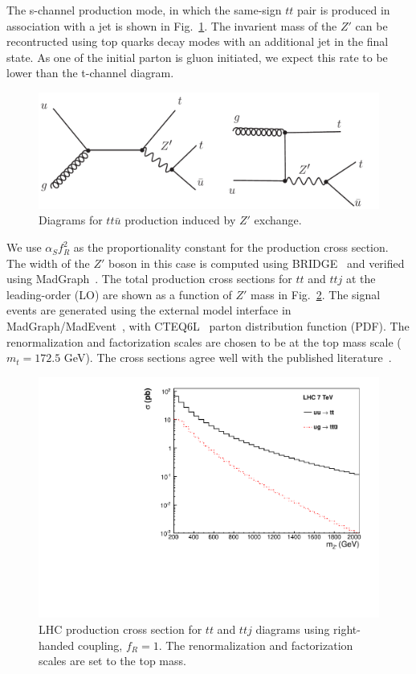 The s-channel production mode, in which the same-sign $tt$ pair is produced in association with a jet is shown in Fig.~\ref{fig:schannel}. 
The invarient mass of the $Z'$ can be recontructed using top quarks decay modes with an additional jet in the final state. 
As one of the initial parton is gluon initiated, we expect this rate to be lower than the t-channel diagram. 

\begin{figure}[htb]
\begin{center}
\includegraphics[width=0.7\linewidth, height=0.25\linewidth]{figs/sstop2.pdf}
\caption{ Diagrams for $tt\bar{u}$ production induced by $Z'$ exchange. \label{fig:schannel}}
\end{center}
\end{figure}

We use $\alpha_Sf_R^2$ as the proportionality constant for the production cross section. 
The width of the $Z'$ boson in this case is computed using BRIDGE~\cite{bridge} and verified using MadGraph~\cite{madgraph}. 
The total production cross sections for $tt$ and $ttj$ at the leading-order (LO) are shown as a function of $Z'$ mass in Fig.~\ref{fig:sstopcross}. 
The signal events are generated using the external model interface in MadGraph/MadEvent~\cite{madgraph}, 
with CTEQ6L~\cite{cteq6l} parton distribution function (PDF). The renormalization and factorization scales are chosen to be at the top mass scale ($m_{t} = 172.5$ GeV). 
The cross sections agree well with the published literature~\cite{berger}. 

\begin{figure}[htb]
\begin{center}
\includegraphics[width=0.7\linewidth]{figs/sstopcross.pdf}
\caption{ LHC production cross section for $tt$ and $ttj$ diagrams using right-handed coupling, $f_R = 1$. 
The renormalization and factorization scales are set to the top mass. \label{fig:sstopcross}}
\end{center}
\end{figure}


